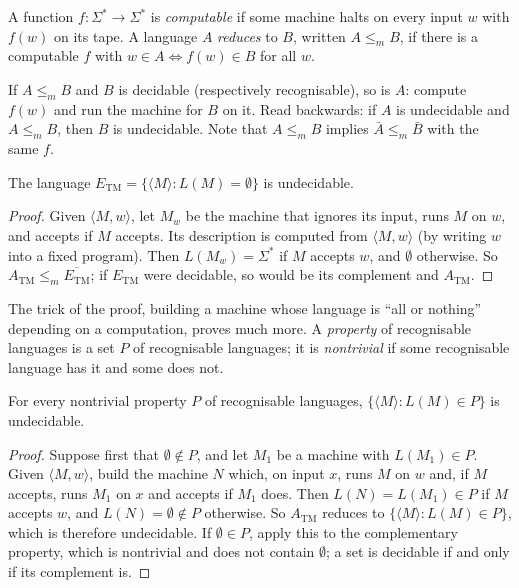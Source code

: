 \begin{definition}\label{def:reduction}
A function $f:\Sigma^*\to\Sigma^*$ is \emph{computable} if some machine halts on every input $w$ with $f(w)$ on its tape. A language $A$ \emph{reduces} to $B$, written $A\le_mB$, if there is a computable $f$ with $w\in A\iff f(w)\in B$ for all $w$.
\end{definition}

If $A\le_mB$ and $B$ is decidable (respectively recognisable), so is $A$: compute $f(w)$ and run the machine for $B$ on it. Read backwards: if $A$ is undecidable and $A\le_mB$, then $B$ is undecidable. Note that $A\le_mB$ implies $\bar A\le_m\bar B$ with the same $f$.

\begin{proposition}\label{prop:emptiness}
The language $E_{\mathrm{TM}}=\{\langle M\rangle:L(M)=\emptyset\}$ is undecidable.
\end{proposition}

\begin{proof}
Given $\langle M,w\rangle$, let $M_w$ be the machine that ignores its input, runs $M$ on $w$, and accepts if $M$ accepts. Its description is computed from $\langle M,w\rangle$ (by writing $w$ into a fixed program). Then $L(M_w)=\Sigma^*$ if $M$ accepts $w$, and $\emptyset$ otherwise. So $A_{\mathrm{TM}}\le_m\overline{E_{\mathrm{TM}}}$; if $E_{\mathrm{TM}}$ were decidable, so would be its complement and $A_{\mathrm{TM}}$.
\end{proof}

The trick of the proof, building a machine whose language is ``all or nothing'' depending on a computation, proves much more. A \emph{property} of recognisable languages is a set $P$ of recognisable languages; it is \emph{nontrivial} if some recognisable language has it and some does not.

\begin{theorem}[Rice, 1953]\label{thm:rice}
For every nontrivial property $P$ of recognisable languages, $\{\langle M\rangle:L(M)\in P\}$ is undecidable.
\end{theorem}

\begin{proof}
Suppose first that $\emptyset\notin P$, and let $M_1$ be a machine with $L(M_1)\in P$. Given $\langle M,w\rangle$, build the machine $N$ which, on input $x$, runs $M$ on $w$ and, if $M$ accepts, runs $M_1$ on $x$ and accepts if $M_1$ does. Then $L(N)=L(M_1)\in P$ if $M$ accepts $w$, and $L(N)=\emptyset\notin P$ otherwise. So $A_{\mathrm{TM}}$ reduces to $\{\langle M\rangle:L(M)\in P\}$, which is therefore undecidable. If $\emptyset\in P$, apply this to the complementary property, which is nontrivial and does not contain $\emptyset$; a set is decidable if and only if its complement is.
\end{proof}

